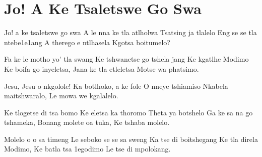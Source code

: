 \starttocol
\chapter{Jo! A Ke Tsaletswe Go Swa}
\nexttocol
\hfill{\it }
\stoptocol
\starttocol
\startlines
{\sc Jo!} a ke tsaletswe go swa
A le nna ke tla atlholwa
Tsatsing ja tlalelo
Eng se se tla ntebe1e1ang
A therego e ntlhasela
Kgotsa boitumelo? 

Fa ke le motho yo' tla swang
Ke tshwanetse go tshela jang
Ke kgatlhe Modimo
Ke boifa go inyeletsa,
Jana ke tla etleletsa
Motse wa phatsimo.

Jesu, Jesu o nkgolole!
Ka botlhoko, a ke fole
O nneye tshiamiso
Nkabela maitshwaralo, 
Le mowa we kgalalelo.

Ke tlogetse di tsa bomo
Ke eletsa ka thoromo
Theta ya botshelo
Ga ke sa na go tshameka,
Bonang molete oa tuka,
Ke tshaba molelo.

Molelo o o sa timeng
Le seboko se se sa sweng
Ka tse di boitshegang
Ke tla direla Modimo,
Ke batla tsa 1egodimo
Le tse di mpolokang.

\stoplines
\nexttocol

\stoptocol
